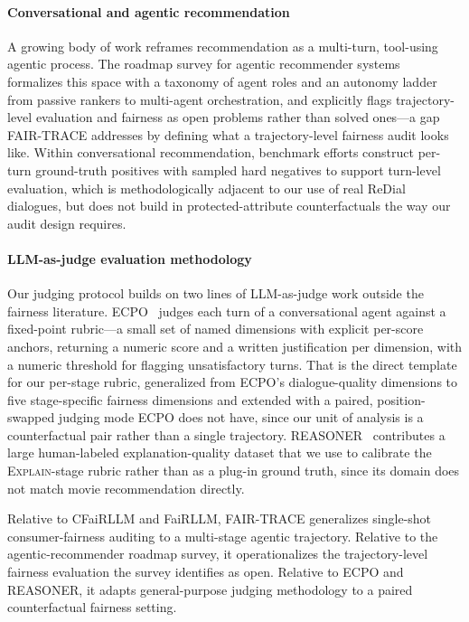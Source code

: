 \documentclass[manuscript,screen,review]{acmart}
\newcommand{\stage}[1]{\textsc{#1}}
\begin{document}
\paragraph{Conversational and agentic recommendation}
A growing body of work reframes recommendation as a multi-turn, tool-using
agentic process. The roadmap survey for agentic recommender
systems~\cite{agenticroadmap} formalizes this space with a taxonomy of agent
roles and an autonomy ladder from passive rankers to multi-agent orchestration,
and explicitly flags trajectory-level evaluation and fairness as open problems
rather than solved ones---a gap FAIR-TRACE addresses by defining what a
trajectory-level fairness audit looks like. Within conversational recommendation,
benchmark efforts construct per-turn ground-truth positives with sampled hard
negatives to support turn-level evaluation, which is methodologically adjacent to
our use of real ReDial dialogues, but does not build in protected-attribute
counterfactuals the way our audit design requires.

\paragraph{LLM-as-judge evaluation methodology}
Our judging protocol builds on two lines of LLM-as-judge work outside the
fairness literature. ECPO~\cite{ecpo} judges each turn of a conversational agent
against a fixed-point rubric---a small set of named dimensions with explicit
per-score anchors, returning a numeric score and a written justification per
dimension, with a numeric threshold for flagging unsatisfactory turns. That is
the direct template for our per-stage rubric, generalized from ECPO's
dialogue-quality dimensions to five stage-specific fairness dimensions and
extended with a paired, position-swapped judging mode ECPO does not have, since
our unit of analysis is a counterfactual pair rather than a single trajectory.
REASONER~\cite{reasoner} contributes a large human-labeled explanation-quality
dataset that we use to calibrate the \stage{Explain}-stage rubric rather than as
a plug-in ground truth, since its domain does not match movie recommendation
directly.

Relative to CFaiRLLM and FaiRLLM, FAIR-TRACE generalizes single-shot
consumer-fairness auditing to a multi-stage agentic trajectory. Relative to the
agentic-recommender roadmap survey, it operationalizes the trajectory-level
fairness evaluation the survey identifies as open. Relative to ECPO and REASONER,
it adapts general-purpose judging methodology to a paired counterfactual fairness
setting.
\end{document}

